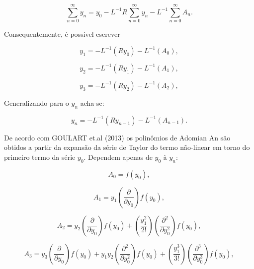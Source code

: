  \begin{equation}
 \sum_{n=0}^{\infty} y_{n} = y_{0} - L^{-1}R \sum_{n=0}^{\infty} y_{n} - L^{-1}\sum_{n=0}^{\infty} A_{n}.
 \end{equation}
 
 Consequentemente, é possível escrever
 
 \begin{equation}
 y_{1} = -L^{-1} (Ry_{0}) - L^{-1}(A_{0}), \end{equation}
 
 \begin{equation}y_{2} = -L^{-1} (Ry_{1}) - L^{-1}(A_{1}),\end{equation}
 
 \begin{equation}y_{3} = -L^{-1} (Ry_{2}) - L^{-1}(A_{2}),
 \end{equation}
 
 Generalizando para o $y_{n}$ acha-se:
 
 \begin{equation}y_{n} = -L^{-1} (Ry_{n-1}) - L^{-1}(A_{n-1}).
 \end{equation}
 
  De acordo com GOULART et.al (2013) os polinômios de Adomian An são obtidos a partir da expansão da série de Taylor do termo não-linear em torno do primeiro termo da série $y_{0}$. Dependem apenas de $y_{0}$ à $y_{n}$:
  
  \begin{equation}
  A_{0} = f(y_{0}),
  \end{equation}
  
   \begin{equation}
  A_{1} = y_{1}\left(\dfrac{\partial }{\partial y_{0}}\right) f(y_{0}),
  \end{equation}
  
  \begin{equation}
  A_{2} = y_{2} \left(\dfrac{\partial }{\partial y_{0}}\right)f(y_{0}) +\left(\dfrac{y_{1}^2}{2!}\right)\left(\dfrac{\partial^2 }{\partial y_{0}^2}\right)f(y_{0}),
  \end{equation}
 
   \begin{equation}
  A_{3} = y_{3} \left(\dfrac{\partial }{\partial y_{0}}\right)f(y_{0}) + y_{1}y_{2}\left(\dfrac{\partial^2 }{\partial y_{0}^2}\right)f(y_{0}) + \left(\dfrac{y_{1}^3}{3!}\right)\left(\dfrac{\partial^3 }{\partial y_{0}^3}\right)f(y_{0}),
  \end{equation}
  
